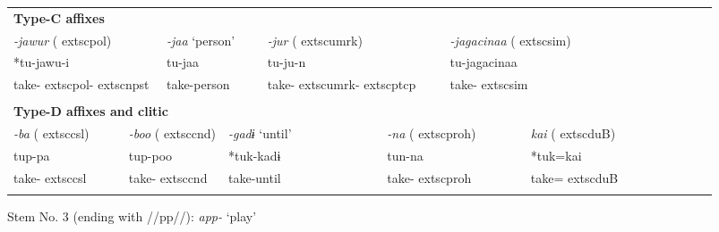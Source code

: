\begin{tabularx}{\textwidth}{XXXXXXXXXXXXXXXXXXXXXXX}
\multicolumn{23}{X}{{\bfseries Type-C affixes}}\\
\multicolumn{4}{X}{{ \textit{{}-jawur} (	extsc{pol})}} & \multicolumn{3}{X}{{ \textit{{}-jaa} ‘person’}} & \multicolumn{3}{X}{{ \textit{{}-jur} (	extsc{umrk})}} & \multicolumn{4}{X}{{ \textit{{}-jagacinaa} (	extsc{sim})}} & \multicolumn{9}{X}{}\\
\multicolumn{4}{X}{{ *tu-jawu-i}} & \multicolumn{3}{X}{tu-jaa} & \multicolumn{3}{X}{tu-ju-n} & \multicolumn{4}{X}{{ tu-jagacinaa}} & \multicolumn{9}{X}{}\\
\multicolumn{4}{X}{take-	extsc{pol}-	extsc{npst}} & \multicolumn{3}{X}{take-person} & \multicolumn{3}{X}{take-	extsc{umrk}-	extsc{ptcp}} & \multicolumn{4}{X}{take-	extsc{sim}} & \multicolumn{9}{X}{}\\
\multicolumn{23}{X}{}\\
\multicolumn{23}{X}{{\bfseries Type-D affixes and clitic}}\\
\multicolumn{2}{X}{{ \textit{{}-ba} (	extsc{csl})}} & \multicolumn{4}{X}{{ \textit{{}-boo} (	extsc{cnd})}} & \multicolumn{3}{X}{{ \textit{{}-gadɨ} ‘until’}} & \multicolumn{3}{X}{{ \textit{{}-na} (	extsc{proh})}} & \multicolumn{4}{X}{{ \textit{kai} (	extsc{du}B)}} & \multicolumn{7}{X}{}\\
\multicolumn{2}{X}{{ tup-pa}} & \multicolumn{4}{X}{{ tup-poo}} & \multicolumn{3}{X}{{ *tuk-kadɨ}} & \multicolumn{3}{X}{{ tun-na}} & \multicolumn{4}{X}{{ *tuk=kai}} & \multicolumn{7}{X}{}\\
\multicolumn{2}{X}{take-	extsc{csl}} & \multicolumn{4}{X}{take-	extsc{cnd}} & \multicolumn{3}{X}{take-until} & \multicolumn{3}{X}{take-	extsc{proh}} & \multicolumn{4}{X}{take=	extsc{du}B} & \multicolumn{7}{X}{}\\
\lspbottomrule
\end{tabularx}
Stem No. 3 (ending with //pp//): \textit{app-} ‘play’

\tablefirsthead{}

